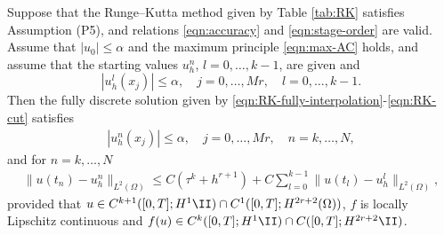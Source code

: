 \begin{theorem}\label{thm:RK-error}
Suppose that the Runge--Kutta method given by Table \ref{tab:RK} satisfies Assumption (P5),
and relations \eqref{eqn:accuracy} and \eqref{eqn:stage-order}  are valid.
Assume that $|u_0| \le \alpha$ and the maximum principle \eqref{eqn:max-AC} holds,
 and assume that the starting values $u_h^n$, $l=0,\dots,k-1$, are given and
$$
|u_h^l(x_j)|\le \alpha , \quad j=0,\dots,Mr,\quad l=0,\dots,k-1.
$$
Then the   {fully discrete} solution given by \eqref{eqn:RK-fully-interpolation}-\eqref{eqn:RK-cut} satisfies
\begin{align*}
|u_h^n(x_j)|\le \alpha , \quad j=0,\dots,Mr,\quad n=k,\dots,N,
\end{align*}
and  {for $n=k,\ldots,N$}
\begin{align*}
  \| u(t_n) - u_h^n \|_{L^2(\Omega)} \le  C(\tau^k + h^{r+1}) + C\sum_{l=0}^{k-1}\| u(t_l) - u_h^l \|_{L^2(\Omega)} ,
\end{align*}
provided that {$u\in C^{k+1}([0,T]; H^1\II) \cap C^1([0,T];H^{2r+2}(\Omega))$,
$f$ is locally Lipschitz continuous and $f(u)\in C^k([0,T];H^1\II)\cap C([0,T];H^{2r+2}\II)$.}
\end{theorem}

